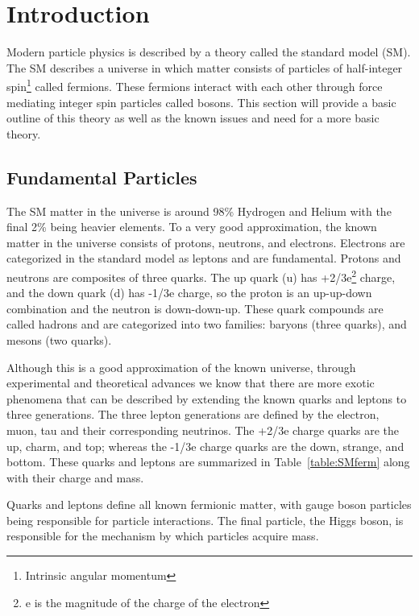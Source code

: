 \chapter{Introduction}
\label{sec:intro}
Modern particle physics is described by a theory called the standard model (SM).  
The SM describes a universe in which matter consists of particles of half-integer spin\footnote{Intrinsic angular momentum} called fermions.  
These fermions interact with each other through force mediating integer spin particles called bosons.  
This section will provide a basic outline of this theory as well as the known issues and need for a more basic theory.

\section{Fundamental Particles}
The SM matter in the universe is around 98\% Hydrogen and Helium with the final 2\% being heavier elements.  
To a very good approximation, the known matter in the universe consists of protons, neutrons, and electrons.  
Electrons are categorized in the standard model as leptons and are fundamental.  
Protons and neutrons are composites of three quarks.  
The up quark (u) has +2/3e\footnote{e is the magnitude of the charge of the electron} charge, and the down quark (d) has -1/3e charge, so the proton is an up-up-down combination and the neutron is down-down-up.  
These quark compounds are called hadrons and are categorized into two families: baryons (three quarks), and mesons (two quarks).

Although this is a good approximation of the known universe, through experimental and theoretical advances we know that there are 
more exotic phenomena that can be described by extending the known quarks and leptons to three generations.  
The three lepton generations are defined by the electron, muon, tau and their corresponding neutrinos.
The +2/3e charge quarks are the up, charm, and top; whereas the -1/3e charge quarks are the down, strange, and bottom.  
These quarks and leptons are summarized in Table~\ref{table:SMferm} along with their charge and mass.
    
Quarks and leptons define all known fermionic matter, with gauge boson particles being responsible for particle interactions.  
The final particle, the Higgs boson, is responsible for the mechanism by which particles acquire mass.  
    

